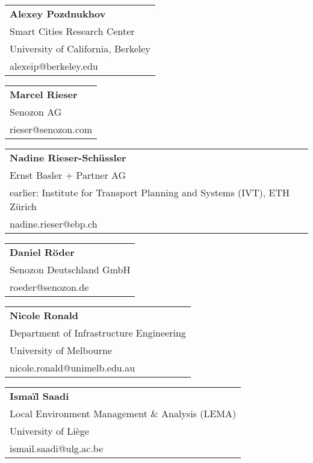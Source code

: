 \begin{tabular}[width=0.48\textwidth]{@{}l}
\textbf{Alexey Pozdnukhov} \\
Smart Cities Research Center \\
University of California, Berkeley \\
alexeip@berkeley.edu \\
\end{tabular}

\begin{tabular}[width=0.48\textwidth]{@{}l}
\textbf{Marcel Rieser} \\
Senozon AG \\
rieser@senozon.com \\
\end{tabular}

\begin{tabular}[width=0.48\textwidth]{@{}l}
\textbf{Nadine Rieser-Schüssler} \\
Ernst Basler + Partner AG \\
earlier: Institute for Transport Planning and Systems (IVT), ETH Zürich \\
nadine.rieser@ebp.ch \\
\end{tabular}

\begin{tabular}[width=0.48\textwidth]{@{}l}
\textbf{Daniel Röder} \\
Senozon Deutschland GmbH \\
roeder@senozon.de \\
\end{tabular}

\begin{tabular}[width=0.48\textwidth]{@{}l}
\textbf{Nicole Ronald} \\
Department of Infrastructure Engineering \\
University of Melbourne \\
nicole.ronald@unimelb.edu.au \\
\end{tabular}

\begin{tabular}[width=0.48\textwidth]{@{}l}
\textbf{Ismaïl Saadi} \\
Local Environment Management \& Analysis (LEMA) \\
University of Liège \\
ismail.saadi@ulg.ac.be \\
\end{tabular}

